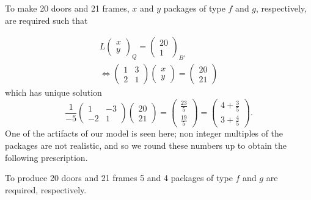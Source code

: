 \documentclass[12pt]{article}
\def\ba{\left(\begin{array}{cc}}
\def\ea{\end{array}\right) }
\def\bv{\left(\begin{array}{c}}
\def\ev{\end{array}\right) }
\def\LR{\Leftrightarrow}
\begin{document}
\begin{enumerate}
\begin{enumerate}
To make 20 doors and 21 frames, $x$ and $y$ packages of type $f$ and $g$, respectively, are required such that 

\begin{gather*}L\bv x\\y \ev_Q = \bv 20\\1 \ev_{B'}\\
\LR 
      \ba 1&3\\2&1\ea \bv x\\y \ev 
= \bv 20\\21 \ev
\end{gather*}
which  has unique solution  
\[
\frac{1}{-5}   \ba1&-3 \\ -2&1 \ea \bv 20\\21 \ev 
= 
\bv \frac{23}{5}  \\  \frac{19}{5}\ev 
=
\bv 4+\frac{3}{5}  \\  3+\frac{4}{5}\ev 
.\] 
One of the artifacts of our model is seen here; non integer multiples of the packages are not realistic, 
and so we  round these numbers up to obtain the following prescription.

To produce 20 doors and 21 frames 5 and 4 packages of type $f$ and $g$ are required, respectively. 
\end{enumerate}
\end{enumerate}
\end{document}
